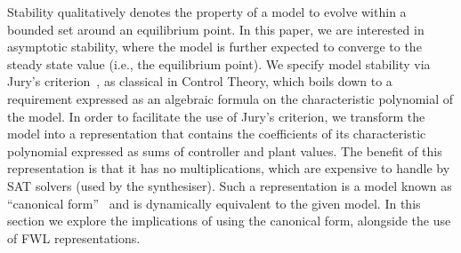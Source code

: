 \documentclass[sigconf]{llncs}
\begin{document}
Stability qualitatively denotes the property of a model to evolve within a bounded set around an equilibrium point. 
In this paper, we are interested in asymptotic stability, where the model is further expected to converge to the steady state value (i.e., the equilibrium point).   
%
We specify model stability via Jury's criterion~\cite{fadali}, 
as classical in Control Theory,  %
 which boils down to a requirement expressed as an algebraic formula 
 on the characteristic polynomial of the model.%
%
In order to facilitate the use of Jury's criterion, we transform the model into
a representation that contains the coefficients of its characteristic
polynomial expressed as sums of controller and plant values. 
The benefit of this representation is that it has no multiplications, which are expensive to handle by SAT solvers (used by the synthesiser). 
%
Such a representation is a model known as 
``canonical form''~\cite{Astrom08} %
and is dynamically equivalent to the given model.  
In this section we explore the implications of using the canonical form, 
alongside the use of FWL representations.  

\medskip
\end{document}
